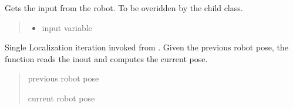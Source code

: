 \documentclass[letterpaper,10pt,english]{sphinxmanual}
\begin{document}
\begin{fulllineitems}
\begin{fulllineitems}
\begin{quote}
\begin{description}
\begin{itemize}
\end{itemize}

\end{description}\end{quote}

\end{fulllineitems}


\begin{fulllineitems}
\label{\detokenize{Localization:Localization.Localization.GetInput}}
\pysigstartsignatures
{}
\pysigstopsignatures
\sphinxAtStartPar
Gets the input from the robot. To be overidden by the child class.
\begin{quote}\begin{description}
\sphinxAtStartPar
\begin{itemize}
\item {} 
\sphinxAtStartPar
{} input variable

\end{itemize}


\end{description}\end{quote}

\end{fulllineitems}


\begin{fulllineitems}
\label{\detokenize{Localization:Localization.Localization.Localize}}
\pysigstartsignatures
{}
\pysigstopsignatures
\sphinxAtStartPar
Single Localization iteration invoked from . Given the previous robot pose, the function reads the inout and computes the current pose.
\begin{quote}\begin{description}
\sphinxAtStartPar
{} \textendash{} previous robot pose

\sphinxAtStartPar
{} current robot pose


\end{description}
\end{quote}
\end{fulllineitems}
\end{fulllineitems}
\end{document}
